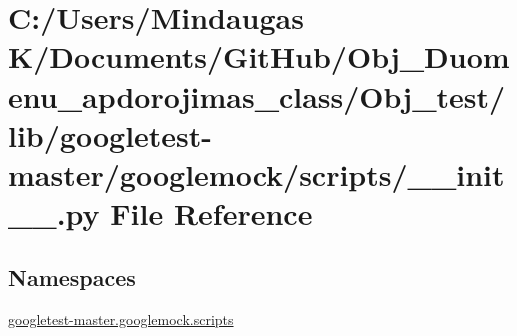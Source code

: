 \hypertarget{_obj__test_2lib_2googletest-master_2googlemock_2scripts_2____init_____8py}{}\section{C\+:/\+Users/\+Mindaugas K/\+Documents/\+Git\+Hub/\+Obj\+\_\+\+Duomenu\+\_\+apdorojimas\+\_\+class/\+Obj\+\_\+test/lib/googletest-\/master/googlemock/scripts/\+\_\+\+\_\+init\+\_\+\+\_\+.py File Reference}
\label{_obj__test_2lib_2googletest-master_2googlemock_2scripts_2____init_____8py}
\subsection*{Namespaces}
\begin{DoxyCompactItemize}
\item 
 \mbox{\hyperlink{namespacegoogletest-master_1_1googlemock_1_1scripts}{googletest-\/master.\+googlemock.\+scripts}}
\end{DoxyCompactItemize}
